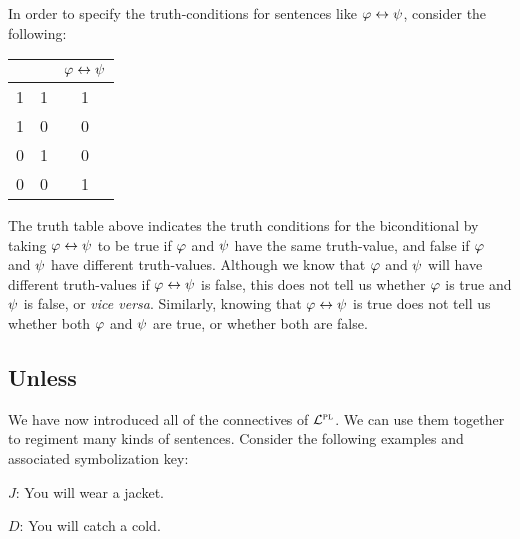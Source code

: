 
In order to specify the truth-conditions for sentences like $\varphi\leftrightarrow\psi$, consider the following:

\begin{center}
\begin{tabular}{c|c|c}
\metaA{} & \metaB{} & $\varphi{}\leftrightarrow\psi{}$\\
\hline
1 & 1 & 1\\
1 & 0 & 0\\
0 & 1 & 0\\
0 & 0 & 1
\end{tabular}
\end{center}

The truth table above indicates the truth conditions for the biconditional by taking $\varphi \leftrightarrow \psi$ to be true if $\varphi$ and $\psi$ have the same truth-value, and false if $\varphi$ and $\psi$ have different truth-values.
Although we know that $\varphi$ and $\psi$ will have different truth-values if $\varphi \leftrightarrow \psi$ is false, this does not tell us whether $\varphi$ is true and $\psi$ is false, or \textit{vice versa}.
Similarly, knowing that $\varphi \leftrightarrow \psi$ is true does not tell us whether both $\varphi$ and $\psi$ are true, or whether both are false. 



\subsection{Unless}
  \label{sub.unless}

We have now introduced all of the connectives of $\mathcal{L}^{\textsc{pl}}$.
We can use them together to regiment many kinds of sentences.
Consider the following examples and associated symbolization key:%

\begin{earg}
\end{earg}


\begin{ekey}
  \item[$J$:] You will wear a jacket.
  \item[$D$:] You will catch a cold.
\end{ekey}

